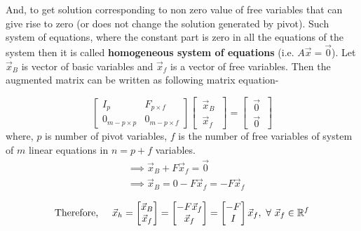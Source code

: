 \documentclass{article}
\begin{document}
And, to get solution corresponding to non zero value of free variables that can give rise to zero (or does not change the solution generated by pivot). Such system of equations, where the constant part is zero in all the equations of the system then it is called \textbf{homogeneous system of equations} (i.e. $A\vec{x}=\vec{0}$). Let $\vec{x}_B$ is vector of basic variables and $\vec{x}_f$ is a vector of free variables. Then the augmented matrix can be written as following matrix equation-

\[
\left[\begin{array}{c|c}
    I_p &F_{p\times f} \\
    \hline 
    0_{m-p\times p} & 0_{m-p\times f} 
  \end{array}\right] \begin{bmatrix}
                            ~\vec{x}_B~\\
                            \hline
                            ~\vec{x}_f~
                          \end{bmatrix}= \begin{bmatrix}
                            ~\vec{0}~\\
                            \hline
                            ~\vec{0}~
                          \end{bmatrix}
\]
where, $p$ is number of pivot variables, $f$ is the number of free variables of system of $m$ linear equations in $n=p+f$ variables.
\begin{align*}
&\implies \vec{x}_B + F\vec{x}_f = \vec{0} \\
&\implies \vec{x}_B = 0 - F\vec{x}_f = -F\vec{x}_f\\
\end{align*}
\[
\text{Therefore,\hspace{5mm}}  \vec{x}_h =  
\begin{bmatrix}
    \vec{x}_B\\ 
    \vec{x}_f
\end{bmatrix} = \begin{bmatrix}
                -F\vec{x}_f\\\vec{x}_f
                \end{bmatrix} = \begin{bmatrix}
                                                    -F\\I
                                                \end{bmatrix} \vec{x}_f, ~\forall ~ \vec{x}_f \in \mathbb{R}^f\]
\\
\end{document}
